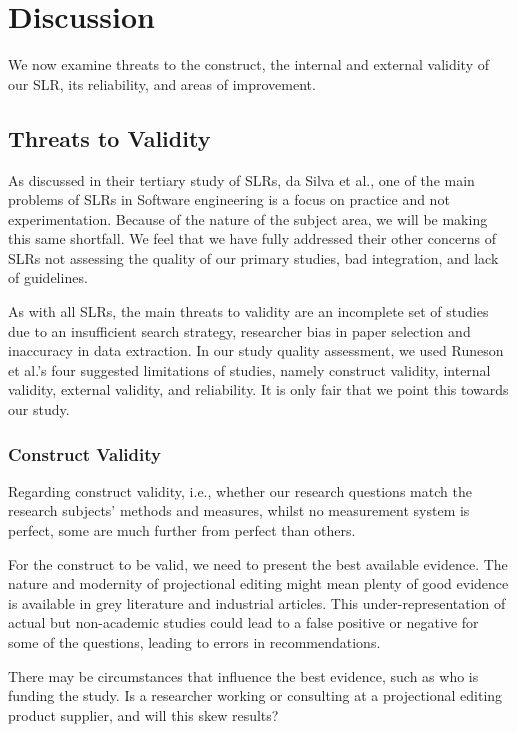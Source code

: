 \section{Discussion}
\label{section:slr_discussion}

We now examine threats to the construct, the internal and external validity of our SLR, its reliability, and areas of improvement.

 
\subsection{Threats to Validity}  
As discussed in their tertiary study of SLRs, da Silva et al.\cite{DaSilvaFabioQ.B2011Syos}, one of the main problems of SLRs in Software engineering is a focus on practice and not experimentation.
Because of the nature of the subject area, we will be making this same shortfall. 
We feel that we have fully addressed their other concerns of SLRs not assessing the quality of our primary studies, bad integration, and lack of guidelines.

As with all SLRs, the main threats to validity are an incomplete set of studies due to an insufficient search strategy, researcher bias in paper selection and inaccuracy in data extraction.
In our study quality assessment, we used Runeson et al.'s\cite{runeson2009guidelines} four suggested limitations of studies, namely construct validity, internal validity, external validity, and reliability.
It is only fair that we point this towards our study.

\subsubsection{Construct Validity}
Regarding construct validity, i.e., whether our research questions match the research subjects' methods and measures, whilst no measurement system is perfect, some are much further from perfect than others.

For the construct to be valid, we need to present the best available evidence.
The nature and modernity of projectional editing might mean plenty of good evidence is available in grey literature and industrial articles. 
This under-representation of actual but non-academic studies could lead to a false positive or negative for some of the questions, leading to errors in recommendations.

There may be circumstances that influence the best evidence, such as who is funding the study. 
Is a researcher working or consulting at a projectional editing product supplier, and will this skew results?

